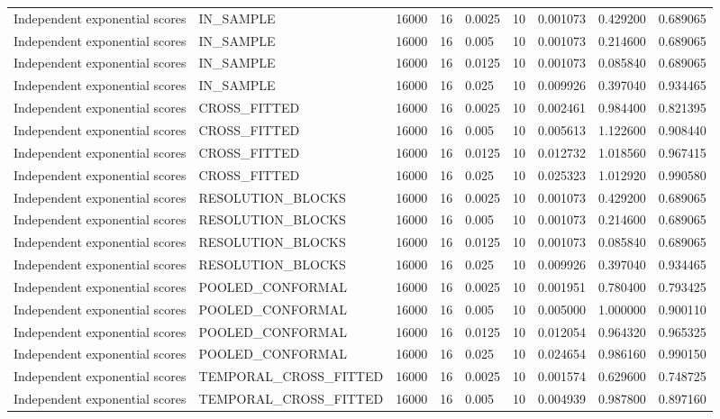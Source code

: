 \begin{tabular}{lllllllll}
Independent exponential scores & IN\_SAMPLE & 16000 & 16 & 0.0025 & 10 & 0.001073 & 0.429200 & 0.689065 \\
Independent exponential scores & IN\_SAMPLE & 16000 & 16 & 0.005 & 10 & 0.001073 & 0.214600 & 0.689065 \\
Independent exponential scores & IN\_SAMPLE & 16000 & 16 & 0.0125 & 10 & 0.001073 & 0.085840 & 0.689065 \\
Independent exponential scores & IN\_SAMPLE & 16000 & 16 & 0.025 & 10 & 0.009926 & 0.397040 & 0.934465 \\
Independent exponential scores & CROSS\_FITTED & 16000 & 16 & 0.0025 & 10 & 0.002461 & 0.984400 & 0.821395 \\
Independent exponential scores & CROSS\_FITTED & 16000 & 16 & 0.005 & 10 & 0.005613 & 1.122600 & 0.908440 \\
Independent exponential scores & CROSS\_FITTED & 16000 & 16 & 0.0125 & 10 & 0.012732 & 1.018560 & 0.967415 \\
Independent exponential scores & CROSS\_FITTED & 16000 & 16 & 0.025 & 10 & 0.025323 & 1.012920 & 0.990580 \\
Independent exponential scores & RESOLUTION\_BLOCKS & 16000 & 16 & 0.0025 & 10 & 0.001073 & 0.429200 & 0.689065 \\
Independent exponential scores & RESOLUTION\_BLOCKS & 16000 & 16 & 0.005 & 10 & 0.001073 & 0.214600 & 0.689065 \\
Independent exponential scores & RESOLUTION\_BLOCKS & 16000 & 16 & 0.0125 & 10 & 0.001073 & 0.085840 & 0.689065 \\
Independent exponential scores & RESOLUTION\_BLOCKS & 16000 & 16 & 0.025 & 10 & 0.009926 & 0.397040 & 0.934465 \\
Independent exponential scores & POOLED\_CONFORMAL & 16000 & 16 & 0.0025 & 10 & 0.001951 & 0.780400 & 0.793425 \\
Independent exponential scores & POOLED\_CONFORMAL & 16000 & 16 & 0.005 & 10 & 0.005000 & 1.000000 & 0.900110 \\
Independent exponential scores & POOLED\_CONFORMAL & 16000 & 16 & 0.0125 & 10 & 0.012054 & 0.964320 & 0.965325 \\
Independent exponential scores & POOLED\_CONFORMAL & 16000 & 16 & 0.025 & 10 & 0.024654 & 0.986160 & 0.990150 \\
Independent exponential scores & TEMPORAL\_CROSS\_FITTED & 16000 & 16 & 0.0025 & 10 & 0.001574 & 0.629600 & 0.748725 \\
Independent exponential scores & TEMPORAL\_CROSS\_FITTED & 16000 & 16 & 0.005 & 10 & 0.004939 & 0.987800 & 0.897160 \\

\end{tabular}
